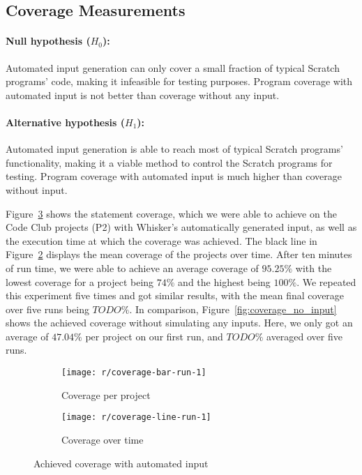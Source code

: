 \subsection{Coverage Measurements}

\paragraph{Null hypothesis ($H_0$):}
Automated input generation can only cover a small fraction of typical Scratch programs' code, making it infeasible for testing purposes.
Program coverage with automated input is not better than coverage without any input.
\paragraph{Alternative hypothesis ($H_1$):}
Automated input generation is able to reach most of typical Scratch programs' functionality, making it a viable method to control the Scratch programs for testing.
Program coverage with automated input is much higher than coverage without input.
\parspace

\noindent Figure~\ref{fig:coverage} shows the statement coverage, which we were able to achieve on the Code Club projects (P2)
with Whisker's automatically generated input,
as well as the execution time at which the coverage was achieved.
The black line in Figure~\ref{fig:coverage_line} displays the mean coverage of the projects over time.
After ten minutes of run time, we were able to achieve an average coverage of $95.25\%$ with the lowest coverage for a project being $74\%$ and the highest being $100\%$.
We repeated this experiment five times and got similar results, with the mean final coverage over five runs being $TODO\%$.
In comparison, Figure~\ref{fig:coverage_no_input} shows the achieved coverage without simulating any inputs.
Here, we only got an average of $47.04\%$ per project on our first run, and $TODO\%$ averaged over five runs.
\parspace

\begin{figure}[htpb]
    \centering
    \begin{subfigure}{.8\textwidth}
        \texttt{[image: r/coverage-bar-run-1]}
        \caption{Coverage per project}
        \label{fig:coverage_bar}
    \end{subfigure}
    \begin{subfigure}{.8\textwidth}
        \texttt{[image: r/coverage-line-run-1]}
        \caption{Coverage over time}
        \label{fig:coverage_line}
    \end{subfigure}

    \caption{Achieved coverage with automated input}
    \label{fig:coverage}
\end{figure}


